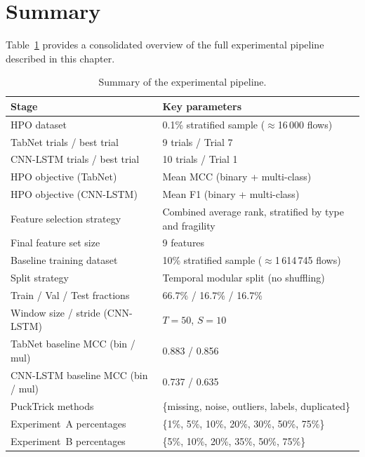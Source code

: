 \documentclass[../main.tex]{subfiles}
\begin{document}
\newpage
\section{Summary}
\label{sec:pipeline-summary}

Table~\ref{tab:pipeline-summary} provides a consolidated overview of the full experimental pipeline described in this chapter.

\begin{table}[H]
\centering
\caption{Summary of the experimental pipeline.}
\label{tab:pipeline-summary}
\small
\begin{tabular}{ll}
\toprule
\textbf{Stage}                    & \textbf{Key parameters} \\
\midrule
HPO dataset                       & 0.1\% stratified sample ($\approx$16\,000 flows) \\
TabNet trials / best trial        & 9 trials / Trial 7 \\
CNN-LSTM trials / best trial      & 10 trials / Trial 1 \\
HPO objective (TabNet)            & Mean MCC (binary + multi-class) \\
HPO objective (CNN-LSTM)          & Mean F1 (binary + multi-class) \\
\midrule
Feature selection strategy        & Combined average rank, stratified by type and fragility \\
Final feature set size            & 9 features \\
\midrule
Baseline training dataset         & 10\% stratified sample ($\approx$1\,614\,745 flows) \\
Split strategy                    & Temporal modular split (no shuffling) \\
Train / Val / Test fractions      & 66.7\% / 16.7\% / 16.7\% \\
Window size / stride (CNN-LSTM)   & $T = 50$, $S = 10$ \\
\midrule
TabNet baseline MCC (bin / mul)   & 0.883 / 0.856 \\
CNN-LSTM baseline MCC (bin / mul) & 0.737 / 0.635 \\
\midrule
PuckTrick methods                 & \{missing, noise, outliers, labels, duplicated\} \\
Experiment~A percentages          & \{1\%, 5\%, 10\%, 20\%, 30\%, 50\%, 75\%\} \\
Experiment~B percentages          & \{5\%, 10\%, 20\%, 35\%, 50\%, 75\%\} \\

\end{tabular}
\end{table}
\end{document}
